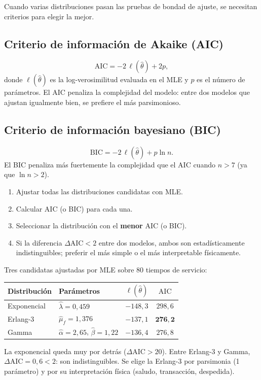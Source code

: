 \documentclass[11pt, letterpaper]{article}
\begin{document}
Cuando varias distribuciones pasan las pruebas de bondad de ajuste, se necesitan criterios para elegir la mejor.

\subsection{Criterio de información de Akaike (AIC)}
\[
\text{AIC} = -2\,\ell(\hat\theta) + 2p,
\]
donde $\ell(\hat\theta)$ es la log-verosimilitud evaluada en el MLE y $p$ es el número de parámetros. El AIC penaliza la complejidad del modelo: entre dos modelos que ajustan igualmente bien, se prefiere el más parsimonioso.

\subsection{Criterio de información bayesiano (BIC)}
\[
\text{BIC} = -2\,\ell(\hat\theta) + p\ln n.
\]
El BIC penaliza más fuertemente la complejidad que el AIC cuando $n > 7$ (ya que $\ln n > 2$).

\begin{metodobox}
\begin{enumerate}
    \item Ajustar todas las distribuciones candidatas con MLE.
    \item Calcular AIC (o BIC) para cada una.
    \item Seleccionar la distribución con el \textbf{menor} AIC (o BIC).
    \item Si la diferencia $\Delta\text{AIC} < 2$ entre dos modelos, ambos son estadísticamente indistinguibles; preferir el más simple o el más interpretable físicamente.
\end{enumerate}
\end{metodobox}

\begin{ejemplobox}[AIC en el banco completo ($n=80$)]
Tres candidatas ajustadas por MLE sobre 80 tiempos de servicio:

\begin{center}\small
\renewcommand{\arraystretch}{1.25}
\begin{tabular}{llcc}
\toprule
\textbf{Distribución} & \textbf{Parámetros} & $\ell(\hat\theta)$ & $\text{AIC}$ \\
\midrule
Exponencial & $\hat\lambda=0{,}459$                    & $-148{,}3$ & $298{,}6$ \\
Erlang-3    & $\hat\mu_f = 1{,}376$                    & $-137{,}1$ & $\mathbf{276{,}2}$ \\
Gamma       & $\hat\alpha=2{,}65$, $\hat\beta=1{,}22$  & $-136{,}4$ & $276{,}8$ \\
\bottomrule
\end{tabular}
\end{center}

La exponencial queda muy por detrás ($\Delta\text{AIC}>20$). Entre Erlang-3 y Gamma, $\Delta\text{AIC}=0{,}6<2$: son indistinguibles. Se elige la Erlang-3 por parsimonia (1 parámetro) y por su interpretación física (saludo, transacción, despedida).
\end{ejemplobox}
\end{document}
